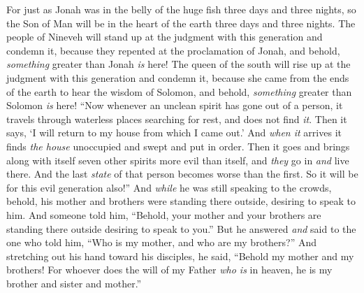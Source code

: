 \begin{biblechapter}
\verse For just as Jonah was in the belly of the huge fish three days and three nights, so the Son of Man will be in the heart of the earth three days and three nights.
\verse The people of Nineveh will stand up at the judgment with this generation and condemn it, because they repented at the proclamation of Jonah, and behold, \textit{something} greater than Jonah \textit{is} here!
\verse The queen of the south will rise up at the judgment with this generation and condemn it, because she came from the ends of the earth to hear the wisdom of Solomon, and behold, \textit{something} greater than Solomon \textit{is} here!
 “Now whenever an unclean spirit has gone out of a person, it travels through waterless places searching for rest, and does not find \textit{it}.
\verse Then it says, ‘I will return to my house from which I came out.’ And \textit{when it} arrives it finds \textit{the house} unoccupied and swept and put in order.
\verse Then it goes and brings along with itself seven other spirits more evil than itself, and \textit{they} go in \textit{and} live there. And the last \textit{state} of that person becomes worse than the first. So it will be for this evil generation also!”
 And \textit{while} he was still speaking to the crowds, behold, his mother and brothers were standing there outside, desiring to speak to him.
\verse And someone told him, “Behold, your mother and your brothers are standing there outside desiring to speak to you.”
\verse But he answered \textit{and} said to the one who told him, “Who is my mother, and who are my brothers?”
\verse And stretching out his hand toward his disciples, he said, “Behold my mother and my brothers!
\verse For whoever does the will of my Father \textit{who is} in heaven, he is my brother and sister and mother.”
\end{biblechapter}

